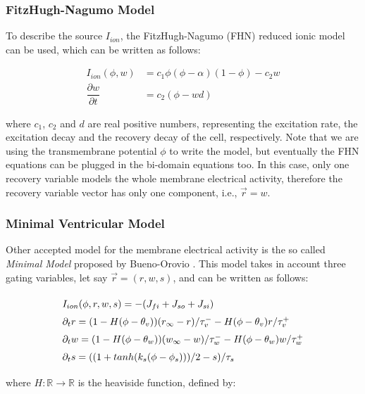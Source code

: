 \subsubsection{FitzHugh-Nagumo Model}

To describe the source $I_{ion}$, the FitzHugh-Nagumo (FHN) reduced ionic model can be used, which can be written as follows:

\begin{align}
I_{ion}(\phi, w) &= c_1 \phi (\phi - \alpha)(1 - \phi) - c_2 w \\
\dfrac{\partial w}{\partial t} &= c_2 (\phi - wd) \nonumber
\end{align}


where $c_1$, $c_2$ and $d$ are real positive numbers, representing the excitation rate, the excitation decay and the recovery decay of the cell, respectively. Note that we are using the transmembrane potential $\phi$ to write the model, but eventually the FHN equations can be plugged in the bi-domain equations too. In this case, only one recovery variable models the whole membrane electrical activity, therefore the recovery variable vector has only one component, i.e., $\vec{r} = w$.


\subsubsection{Minimal Ventricular Model} 

Other accepted model for the membrane electrical activity is the so called \textsl{Minimal Model} proposed by Bueno-Orovio \cite{BUENO_OROVIO_MINIMAL}. This model takes in account three gating variables, let say $\vec{r} = (r,w,s)$, and can be written as follows:

\begin{equation}
\arraycolsep=1.4pt\def\arraystretch{1.5}
\begin{array}{lr}
I_{ion}(\phi, r, w, s) = - (J_{fi} + J_{so} + J_{si}) \\ 
\partial_t r = (1 - H(\phi - \theta_v))(r_\infty - r)/\tau_{v}^- - H(\phi - \theta_v)r/\tau_v^+ \\
\partial_t w = (1 - H(\phi - \theta_w))(w_\infty - w)/\tau_{w}^- - H(\phi - \theta_w)w/\tau_w^+ \\
\partial_t s = ((1 + tanh(k_s(\phi - \phi_s)))/2 - s)/\tau_s
\end{array} \label{eq:mde_min}
\end{equation}

where $H:\mathbb{R} \rightarrow \mathbb{R}$ is the heaviside function, defined by:

